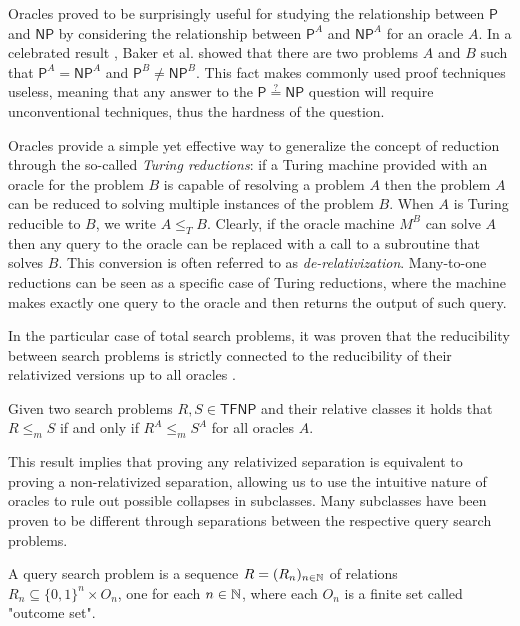 Oracles proved to be surprisingly useful for studying the relationship between $\mathsf{P}$ and $\mathsf{NP}$ by considering the relationship between $\mathsf{P}^A$ and $\mathsf{NP}^A$ for an oracle $A$. In a celebrated result \cite{relativization_p_np}, Baker et al. showed that there are two problems $A$ and $B$ such that $\mathsf{P}^A = \mathsf{NP}^A$ and $\mathsf{P}^B \neq \mathsf{NP}^B$. This fact makes commonly used proof techniques useless, meaning that any answer to the $\mathsf{P} \stackrel{?}{=} \mathsf{NP}$ question will require unconventional techniques, thus the hardness of the question.

Oracles provide a simple yet effective way to generalize the concept of reduction through the so-called \textit{Turing reductions}: if a Turing machine provided with an oracle for the problem $B$ is capable of resolving a problem $A$ then the problem $A$ can be reduced to solving multiple instances of the problem $B$. When $A$ is Turing reducible to $B$, we write $A \leq_T B$. Clearly, if the oracle machine $M^B$ can solve $A$ then any query to the oracle can be replaced with a call to a subroutine that solves $B$. This conversion is often referred to as \textit{de-relativization}. Many-to-one reductions can be seen as a specific case of Turing reductions, where the machine makes exactly one query to the oracle and then returns the output of such query.

In the particular case of total search problems, it was proven that the reducibility between search problems is strictly connected to the reducibility of their relativized versions up to all oracles \cite{rel_comp_np_search}.

\begin{theorem}
 Given two search problems $R,S \in \mathsf{TFNP}$ and their relative classes it holds that $R \leq_m S$ if and only if $R^A \leq_m S^A$ for all oracles $A$.
\end{theorem}

This result implies that proving any relativized separation is equivalent to proving a non-relativized separation, allowing us to use the intuitive nature of oracles to rule out possible collapses in \TFNP subclasses. Many \TFNP subclasses have been proven to be different through separations between the respective query search problems. \cite{proofs_circuits_communication, tfnp_characterization}

\begin{definition}
 A query search problem is a sequence $R = (R_n)_{n \in \mathbb{N}}$ of relations $R_n \subseteq \{0,1\}^n \times O_n$, one for each $n \in \mathbb{N}$, where each $O_n$ is a finite set called "outcome set".
\end{definition}

